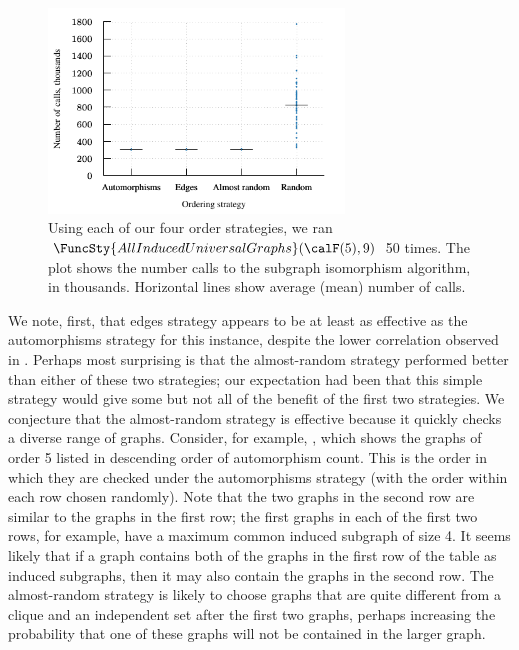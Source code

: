 \begin{figure}[h!]
    \centering

    \includegraphics*[width=0.7\textwidth]{15-universal-graphs/img/second-experiment-plot}

    \caption{Using each of our four order strategies, we ran
        $\FuncSty{AllInducedUniversalGraphs}(\calF(5),9)$ 50 times. The plot
        shows the number calls to the subgraph isomorphism algorithm, in thousands.
        Horizontal lines show average (mean) number of calls.}
\label{fig:second-experiment}
\end{figure}

We note, first, that edges strategy appears to be at least as effective
as the automorphisms strategy for this instance, despite the lower
correlation observed in .  Perhaps most surprising is
that the almost-random strategy performed better than either of these two
strategies; our expectation had been that this simple strategy would
give some but not all of the benefit of the first two strategies.
We conjecture that the almost-random strategy is effective because it
quickly checks a diverse range of graphs.  Consider, for example,
, which shows the graphs of order 5 listed
in descending order of automorphism count.  This is the order in which they
are checked under the automorphisms strategy (with the order within each
row chosen randomly).  Note that the two graphs in the second row are
similar to the graphs in the first row; the first graphs in each of the first
two rows, for example, have a maximum common induced subgraph of size 4.
It seems likely that if a graph contains both of the graphs in the first row of
the table as induced subgraphs, then it may also contain the graphs in the
second row. The almost-random strategy is likely to choose graphs
that are quite different from a clique and an independent set after the first
two graphs, perhaps increasing the probability that one of these graphs
will not be contained in the larger graph.

